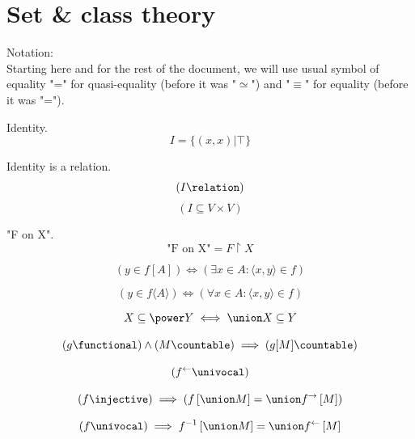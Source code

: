 \def\topic{}


\section{Set \& class theory}
Notation:\\

Starting here and for the rest of the document, we will use usual symbol of equality "=" for quasi-equality (before it was "$\simeq$") and "$\equiv$" for equality (before it was "=").

\begin{definition}
\label{def:identity}
Identity.
\[
I = \{(x,x)|\top\}
\]
\end{definition}

\begin{theorem}
\label{thm:identity is relation}
Identity is a relation.
\[
(I \relation)
\]
\[(I\subseteq V\times V)\]
\end{theorem}


\begin{definition}
"F on X".
\[
\mbox{"F on X"} = F\restriction X
\]
\end{definition}


\begin{definition}
\[
(y\in f[A])
\iff
(\exists x\in A: \langle x,y\rangle\in f)
\]
\end{definition}

\begin{definition}
\[
(y\in f\langle A\rangle)
\iff
(\forall x\in A: \langle x,y\rangle\in f)
\]
\end{definition}
\begin{theorem}
\[
X\subseteq \power Y
\iff
\union X \subseteq Y
\]
\end{theorem}
\begin{theorem}
\[
(g\functional)
\land
(M \countable)
\implies
(g[M] \countable)
\]
\end{theorem}
\begin{theorem}
\[
(f^\leftarrow \univocal)
\]
\end{theorem}

\begin{theorem}
\[
(f\injective)
\implies
(f\left[\union M\right] = \union f^{\rightarrow}\left[M\right])
\]
\end{theorem}

\begin{theorem}
\[
(f\univocal)
\implies
f^{-1}\left[\union M\right] =\union f^{\leftarrow}\left[M\right]
\]
\end{theorem}

